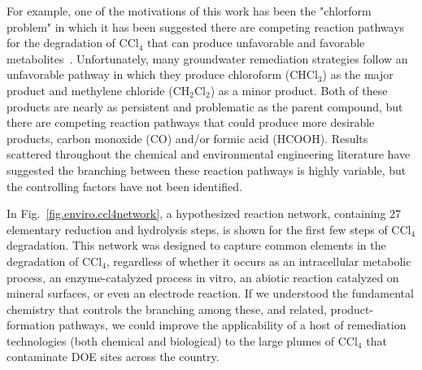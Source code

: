 \documentclass[runningheads,a4paper]{llncs}
\begin{document}
For example, one of the motivations of this work has been the "chlorform problem" in which it has been suggested there are competing reaction pathways for the degradation of CCl$_4$ that can produce unfavorable and favorable metabolites~\cite{tratnyek1998situ,national1978chloroform,pankow1996dense,truex2001assessment,amonette2000dechlorination,kriegman1994transformation,kriegman1992transformation,pecher2002reduction,assaf1994reduction,krone1991reductive}.  Unfortunately, many groundwater remediation strategies follow an unfavorable pathway in which they produce  chloroform (CHCl$_3$) as the major product and methylene chloride (CH$_2$Cl$_2$) as a minor product. Both of these products are nearly as persistent and problematic as the parent compound, but there are competing reaction pathways that could produce more desirable products, carbon monoxide (CO) and/or formic acid (HCOOH).  Results scattered throughout the chemical and environmental engineering literature have suggested the branching between these reaction pathways is highly variable, but the controlling factors have not been identified. 

In Fig.~\ref{fig.enviro.ccl4network}, a hypothesized reaction network, containing 27 elementary reduction and hydrolysis steps, is shown for the first few steps of CCl$_4$ degradation.  This network was designed to capture common elements in the degradation of CCl$_4$, regardless of whether it occurs as an intracellular metabolic process, an enzyme-catalyzed process in vitro, an abiotic reaction catalyzed on mineral surfaces, or even an electrode reaction. If we understood the fundamental chemistry that controls the branching among these, and related, product-formation pathways, we could improve the applicability of a host of remediation technologies (both chemical and biological) to the large plumes of CCl$_4$ that contaminate DOE sites across the country. 
\end{document}
